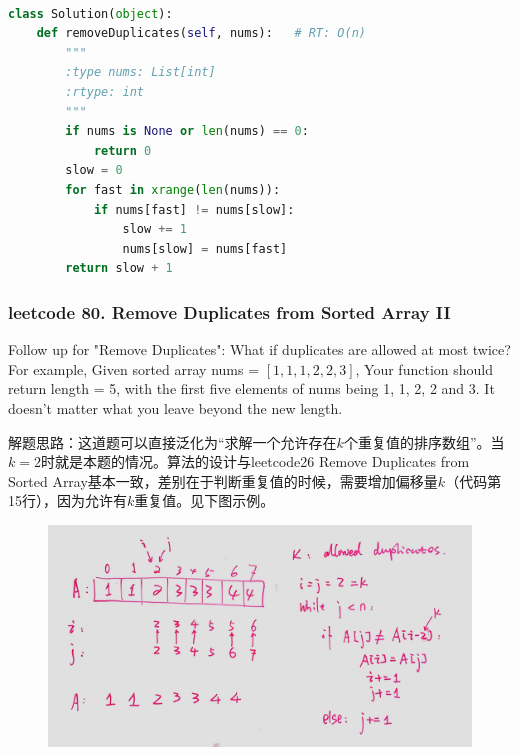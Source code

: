 \documentclass[a4paper,10pt]{article}
\begin{document}
\begin{lstlisting}[language=Python, caption=Problem26. Remove Duplicates from Sorted Array]

class Solution(object):
    def removeDuplicates(self, nums):   # RT: O(n)
        """
        :type nums: List[int]
        :rtype: int
        """
        if nums is None or len(nums) == 0:
            return 0
        slow = 0
        for fast in xrange(len(nums)):
            if nums[fast] != nums[slow]:
                slow += 1
                nums[slow] = nums[fast]
        return slow + 1
\end{lstlisting}





\subsubsection{leetcode 80. Remove Duplicates from Sorted Array II}
Follow up for "Remove Duplicates": What if duplicates are allowed at most twice? For example, Given sorted array nums = $[1,1,1,2,2,3]$, Your function should return length = 5, with the first five elements of nums being 1, 1, 2, 2 and 3. It doesn't matter what you leave beyond the new length.\\

\begin{CJK*}{UTF8}{gbsn}
\noindent 解题思路：这道题可以直接泛化为“求解一个允许存在$k$个重复值的排序数组”。当$k=2$时就是本题的情况。算法的设计与leetcode26 Remove Duplicates from Sorted Array基本一致，差别在于判断重复值的时候，需要增加偏移量$k$（代码第15行），因为允许有$k$重复值。见下图示例。
\end{CJK*}

\begin{figure}[h]
    \includegraphics[width=\textwidth]{leetcode80.jpg}
    \centering\\
\end{figure}
\end{document}

